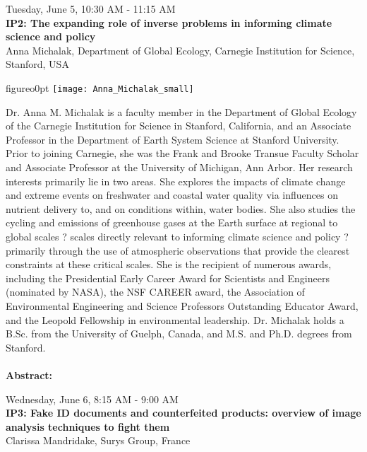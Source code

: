 \newpage\vspace{2cm}
\begin{center}{\Large{
Tuesday, June 5, 10:30 AM - 11:15 AM \\
\textbf{IP2: The expanding role of inverse problems in informing climate science and policy}\\
Anna Michalak, Department of Global Ecology, Carnegie Institution for Science, Stanford, USA}}
\end{center}
\vspace{1cm}

\begin{wrapfloat}{figure}{o}{0pt}
\texttt{[image: Anna\_Michalak\_small]}
\end{wrapfloat}
Dr. Anna M. Michalak is a faculty member in the Department of Global Ecology of the Carnegie Institution for Science in Stanford, California, and an Associate Professor in the Department of Earth System Science at Stanford University. Prior to joining Carnegie, she was the Frank and Brooke Transue Faculty Scholar and Associate Professor at the University of Michigan, Ann Arbor. Her research interests primarily lie in two areas. She explores the impacts of climate change and extreme events on freshwater and coastal water quality via influences on nutrient delivery to, and on conditions within, water bodies. She also studies the cycling and emissions of greenhouse gases at the Earth surface at regional to global scales ? scales directly relevant to informing climate science and policy ? primarily through the use of atmospheric observations that provide the clearest constraints at these critical scales. She is the recipient of numerous awards, including the Presidential Early Career Award for Scientists and Engineers (nominated by NASA), the NSF CAREER award, the Association of Environmental Engineering and Science Professors Outstanding Educator Award, and the Leopold Fellowship in environmental leadership. Dr. Michalak holds a B.Sc. from the University of Guelph, Canada, and M.S. and Ph.D. degrees from Stanford.\\\\
\textbf{Abstract:}\\

\newpage\vspace{2cm}
\begin{center}{\Large{
Wednesday, June 6, 8:15 AM - 9:00 AM \\
\textbf{IP3: Fake ID documents and counterfeited products: overview of image analysis techniques to fight them}\\
Clarissa Mandridake, Surys Group, France}}
\end{center}
\vspace{1cm}

